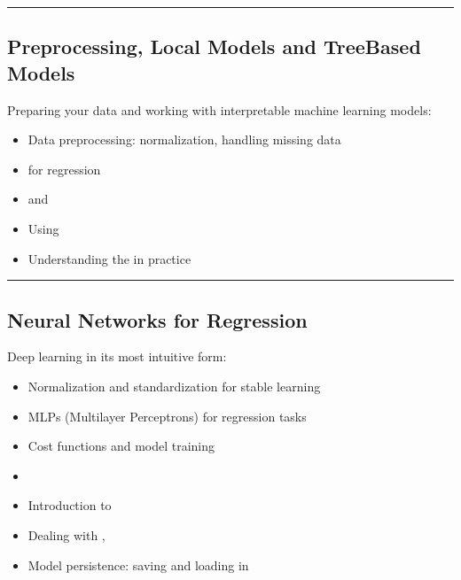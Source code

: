 \documentclass[letterpaper,10pt,english]{jupyterBook}
\begin{document}
\bigskip\hrule\bigskip



\subsection{Preprocessing, Local Models and Tree\sphinxhyphen{}Based Models}
\label{\detokenize{introduction:preprocessing-local-models-and-tree-based-models}}
\sphinxAtStartPar
Preparing your data and working with interpretable machine learning models:
\begin{itemize}
\item {} 
\sphinxAtStartPar
Data preprocessing: normalization, handling missing data

\item {} 
\sphinxAtStartPar
{} for regression

\item {} 
\sphinxAtStartPar
{} and 

\item {} 
\sphinxAtStartPar
Using 

\item {} 
\sphinxAtStartPar
Understanding the  in practice

\end{itemize}


\bigskip\hrule\bigskip



\subsection{Neural Networks for Regression}
\label{\detokenize{introduction:neural-networks-for-regression}}
\sphinxAtStartPar
Deep learning in its most intuitive form:
\begin{itemize}
\item {} 
\sphinxAtStartPar
Normalization and standardization for stable learning

\item {} 
\sphinxAtStartPar
MLPs (Multilayer Perceptrons) for regression tasks

\item {} 
\sphinxAtStartPar
Cost functions and model training

\item {} 
\sphinxAtStartPar
{}

\item {} 
\sphinxAtStartPar
Introduction to 

\item {} 
\sphinxAtStartPar
Dealing with , 

\item {} 
\sphinxAtStartPar
Model persistence: saving and loading in 

\end{itemize}
\end{document}
